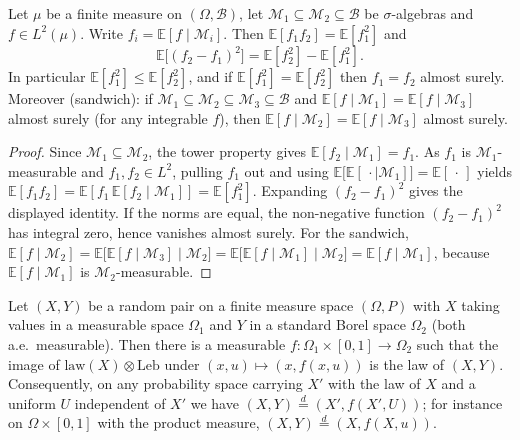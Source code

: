 \begin{lemma}\label{lem:sg:l2proj}
  \leanok
Let $\mu$ be a finite measure on $(\Omega,\mathscr B)$, let $\mathscr M_1\subseteq\mathscr M_2\subseteq\mathscr B$ be $\sigma$-algebras and $f\in L^2(\mu)$. Write $f_i=\mathbb E[f\mid\mathscr M_i]$. Then
$\mathbb E[f_1f_2]=\mathbb E[f_1^2]$ and
\[\mathbb E\big[(f_2-f_1)^2\big]=\mathbb E[f_2^2]-\mathbb E[f_1^2].\]
In particular $\mathbb E[f_1^2]\le\mathbb E[f_2^2]$, and if $\mathbb E[f_1^2]=\mathbb E[f_2^2]$ then $f_1=f_2$ almost surely.
Moreover (sandwich): if $\mathscr M_1\subseteq\mathscr M_2\subseteq\mathscr M_3\subseteq\mathscr B$ and $\mathbb E[f\mid\mathscr M_1]=\mathbb E[f\mid\mathscr M_3]$ almost surely (for any integrable $f$), then
$\mathbb E[f\mid\mathscr M_2]=\mathbb E[f\mid\mathscr M_3]$ almost surely.
\end{lemma}

\begin{proof}
  \leanok
Since $\mathscr M_1\subseteq\mathscr M_2$, the tower property gives $\mathbb E[f_2\mid\mathscr M_1]=f_1$. As $f_1$ is $\mathscr M_1$-measurable and $f_1,f_2\in L^2$, pulling $f_1$ out and using
$\mathbb E\big[\mathbb E[\,\cdot\mid\mathscr M_1]\big]=\mathbb E[\,\cdot\,]$ yields $\mathbb E[f_1f_2]=\mathbb E[f_1\,\mathbb E[f_2\mid\mathscr M_1]]=\mathbb E[f_1^2]$. Expanding $(f_2-f_1)^2$ gives the displayed identity. If the norms are
equal, the non-negative function $(f_2-f_1)^2$ has integral zero, hence vanishes almost surely.
For the sandwich, $\mathbb E[f\mid\mathscr M_2]=\mathbb E\big[\mathbb E[f\mid\mathscr M_3]\mid\mathscr M_2\big]=\mathbb E\big[\mathbb E[f\mid\mathscr M_1]\mid\mathscr M_2\big]=\mathbb E[f\mid\mathscr M_1]$, because $\mathbb E[f\mid\mathscr M_1]$ is $\mathscr M_2$-measurable.
\end{proof}

\begin{lemma}\label{lem:sg:coding}
  \leanok
Let $(X,Y)$ be a random pair on a finite measure space $(\Omega,P)$ with $X$ taking values in a measurable space $\Omega_1$ and $Y$ in a standard Borel space $\Omega_2$ (both a.e.\ measurable). Then there is
a measurable $f:\Omega_1\times[0,1]\to\Omega_2$ such that the image of $\mathrm{law}(X)\otimes\mathrm{Leb}$ under $(x,u)\mapsto(x,f(x,u))$ is the law of $(X,Y)$. Consequently, on any probability space
carrying $X'$ with the law of $X$ and a uniform $U$ independent of $X'$ we have $(X,Y)\overset d=(X',f(X',U))$; for instance on $\Omega\times[0,1]$ with the product measure, $(X,Y)\overset d=(X,f(X,u))$.
\end{lemma}

